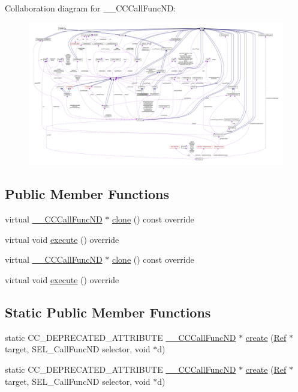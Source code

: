 Collaboration diagram for \+\_\+\+\_\+\+C\+C\+Call\+Func\+ND\+:
\nopagebreak
\begin{figure}[H]
\begin{center}
\leavevmode
\includegraphics[width=350pt]{class____CCCallFuncND__coll__graph}
\end{center}
\end{figure}
\subsection*{Public Member Functions}
\begin{DoxyCompactItemize}
\item 
virtual \hyperlink{class____CCCallFuncND}{\+\_\+\+\_\+\+C\+C\+Call\+Func\+ND} $\ast$ \hyperlink{class____CCCallFuncND_a0b1d35734a49b6c12144e4b025fe84eb}{clone} () const override
\item 
virtual void \hyperlink{class____CCCallFuncND_a1f60a7eca795f5ab5e551c7512b9791a}{execute} () override
\item 
virtual \hyperlink{class____CCCallFuncND}{\+\_\+\+\_\+\+C\+C\+Call\+Func\+ND} $\ast$ \hyperlink{class____CCCallFuncND_a1c4550d2841e8c7469f2831bedfa2726}{clone} () const override
\item 
virtual void \hyperlink{class____CCCallFuncND_a9e3c2cd81860d951e9a83ce29cc40f38}{execute} () override
\end{DoxyCompactItemize}
\subsection*{Static Public Member Functions}
\begin{DoxyCompactItemize}
\item 
static C\+C\+\_\+\+D\+E\+P\+R\+E\+C\+A\+T\+E\+D\+\_\+\+A\+T\+T\+R\+I\+B\+U\+TE \hyperlink{class____CCCallFuncND}{\+\_\+\+\_\+\+C\+C\+Call\+Func\+ND} $\ast$ \hyperlink{class____CCCallFuncND_abcc540f0a13929a4c7115928d6ec5020}{create} (\hyperlink{classRef}{Ref} $\ast$target, S\+E\+L\+\_\+\+Call\+Func\+ND selector, void $\ast$d)
\item 
static C\+C\+\_\+\+D\+E\+P\+R\+E\+C\+A\+T\+E\+D\+\_\+\+A\+T\+T\+R\+I\+B\+U\+TE \hyperlink{class____CCCallFuncND}{\+\_\+\+\_\+\+C\+C\+Call\+Func\+ND} $\ast$ \hyperlink{class____CCCallFuncND_a42dc11764a281241d84f86dbd0ea7c1b}{create} (\hyperlink{classRef}{Ref} $\ast$target, S\+E\+L\+\_\+\+Call\+Func\+ND selector, void $\ast$d)
\end{DoxyCompactItemize}
